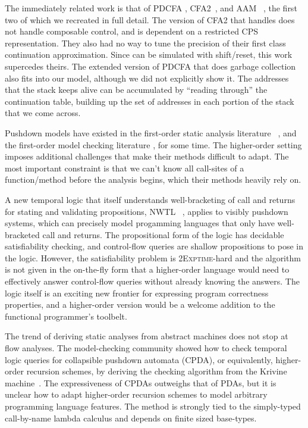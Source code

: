 \documentclass{llncs}
\newcommand{\Scribtexttt}[1]{{\texttt{#1}}}
\newcommand{\SColorize}[2]{\color{#1}{#2}}
\newcommand{\inColor}[2]{{\Scribtexttt{\SColorize{#1}{#2}}}}
\newcommand{\rackett}[1]{\inColor{black}{#1}}
\begin{document}
The immediately related work is that of PDCFA
\citep{ianjohnson:earl2010pdcfa},
CFA2~\citep{ianjohnson:vardoulakis-lmcs11,
  ianjohnson:Vardoulakis2011Pushdown}, and AAM
~\citep{dvanhorn:VanHorn2010Abstracting}, the first two of which we
recreated in full detail. The version of CFA2 that handles
\rackett{call/cc} does not handle composable control, and is dependent
on a restricted CPS representation. They also had no way to tune the
precision of their first class continuation approximation. Since
\rackett{call/cc} can be simulated with shift/reset, this work
supercedes theirs. The extended version of PDCFA that does garbage
collection \citep{dvanhorn:Earl2012Introspective} also fits into our
model, although we did not explicitly show it. The addresses that the
stack keeps alive can be accumulated by ``reading through'' the
continuation table, building up the set of addresses in each portion
of the stack that we come across.

Pushdown models have existed in the first-order static analysis
literature ~\citep[Chapter
7]{local:muchnick:jones:flow-analysis:1981}\citep{ianjohnson:reps:pushdown:1995},
and the first-order model checking literature
\citep{ianjohnson:bouajiani:esparza:pushdown:1997}, for some time. The
higher-order setting imposes additional challenges that make their
methods difficult to adapt. The most important constraint is that we
can't know all call-sites of a function/method before the analysis
begins, which their methods heavily rely on.

A new temporal logic that itself understands well-bracketing of call
and returns for stating and validating propositions, NWTL
~\citep{ianjohnson:alur:nwtl:2007}, applies to visibly pushdown
systems, which can precisely model progamming languages that only have
well-bracketed call and returns. The propositional form of the logic
has decidable satisfiability checking, and control-flow queries are
shallow propositions to pose in the logic. However, the satisfiability
problem is \textsc{2Exptime}-hard and the algorithm is not given in
the on-the-fly form that a higher-order language would need to
effectively answer control-flow queries without already knowing the
answers. The logic itself is an exciting new frontier for expressing
program correctness properties, and a higher-order version would be a
welcome addition to the functional programmer's toolbelt.

The trend of deriving static analyses from abstract machines does not
stop at flow analyses. The model-checking community showed how to
check temporal logic queries for collapsible pushdown automata (CPDA),
or equivalently, higher-order recursion schemes, by deriving the
checking algorithm from the Krivine
machine~\citep{ianjohnson:Salvati:2011:KMH:2027223.2027239}. The
expressiveness of CPDAs outweighs that of PDAs, but it is unclear how
to adapt higher-order recursion schemes to model arbitrary programming
language features. The method is strongly tied to the simply-typed
call-by-name lambda calculus and depends on finite sized base-types.
\end{document}
